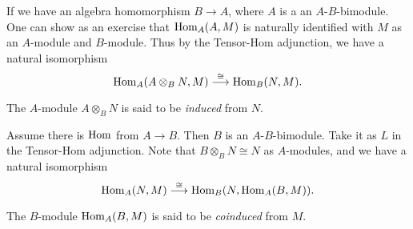\begin{example}
  If we have an algebra homomorphism
  $B \to A$, where $A$ is a
  an $A$-$B$-bimodule. One can
  show as an exercise that
  $\operatorname{Hom}_A(A, M)$ is naturally identified
  with $M$ as an $A$-module and $B$-module.
  Thus by the Tensor-Hom adjunction,
  we have a natural isomorphism
  \[
    \operatorname{Hom}_A(A \otimes_B N, M)
    \overset{\cong}{\longrightarrow}
    \operatorname{Hom}_B(N, M).
  \]
\end{example}

\begin{definition}
  The $A$-module $A \otimes_B N$ is
  said to be \emph{induced} from $N$.
\end{definition}

\begin{remark}
  Assume there is
  $\operatorname{Hom}$ from $A \to B$. Then $B$
  is an $A$-$B$-bimodule. Take it as $L$
  in the Tensor-Hom adjunction.
  Note that $B \otimes_B N \cong N$
  as $A$-modules, and we have a natural
  isomorphism
  \[
    \operatorname{Hom}_A(N, M)
    \overset{\cong}{\longrightarrow}
    \operatorname{Hom}_B(N, \operatorname{Hom}_A(B, M)).
  \]
\end{remark}

\begin{definition}
  The $B$-module $\operatorname{Hom}_A(B, M)$ is
  said to be \emph{coinduced} from $M$.
\end{definition}
